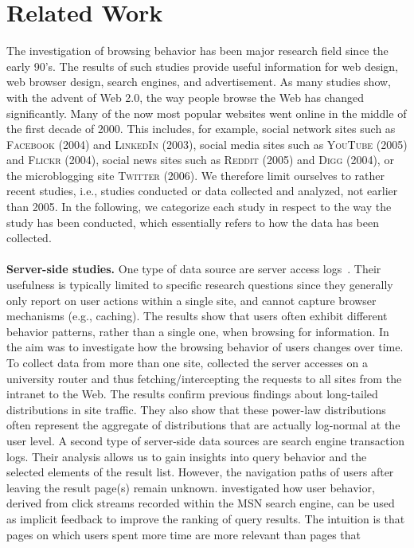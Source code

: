 \documentclass[11pt,fleqn,twoside]{article}
\begin{document}
\section{Related Work}
\label{sec:relatedwork}
The investigation of browsing behavior has been major research field since the early 90's. The results of such studies provide useful information for web design, web browser design, search engines, and advertisement. As many studies show, with the advent of Web 2.0, the way people browse the Web has changed significantly. Many of the now most popular websites went online in the middle of the first decade of 2000. This includes, for example, social network sites such as \textsc{Facebook} (2004) and \textsc{LinkedIn} (2003), social media sites such as \textsc{YouTube} (2005) and \textsc{Flickr} (2004), social news sites such as \textsc{Reddit} (2005) and \textsc{Digg} (2004), or the microblogging site \textsc{Twitter} (2006). We therefore limit ourselves to rather recent studies, i.e., studies conducted or data collected and analyzed, not earlier than 2005. In the following, we categorize each study in respect to the way the study has been conducted, which essentially refers to how the data has been collected.
\\
\\
\textbf{Server-side studies.} One type of data source are server access logs~\cite{Grace10WebLogData}. Their usefulness is typically limited to specific research questions since they generally only report on user actions within a single site, and cannot capture browser mechanisms (e.g., caching).
The results \cite{Xue10UserNavigation} show that users often exhibit different behavior patterns, rather than a single one, when browsing for information. In \cite{Hawwash10MiningAndTracking} the aim was to investigate how the browsing behavior of users changes over time. 
To collect data from more than one site, \cite{Meiss09WhatsInASession} collected the server accesses on a university router and thus fetching/intercepting the requests to all sites from the intranet to the Web. The results confirm previous findings about long-tailed distributions in site traffic. They also show that these power-law distributions often represent the aggregate of distributions that are actually log-normal at the user level. A second type of server-side data sources are search engine transaction logs. Their analysis allows us to gain insights into query behavior and the selected elements of the result list. However, the navigation paths of users after leaving the result page(s) remain unknown. \cite{Agichtein06ImprovingWebSearch} investigated how user behavior, derived from click streams recorded within the MSN search engine, can be used as implicit feedback to improve the ranking of query results. The intuition is that pages on which users spent more time are more relevant than pages that 
\end{document}
